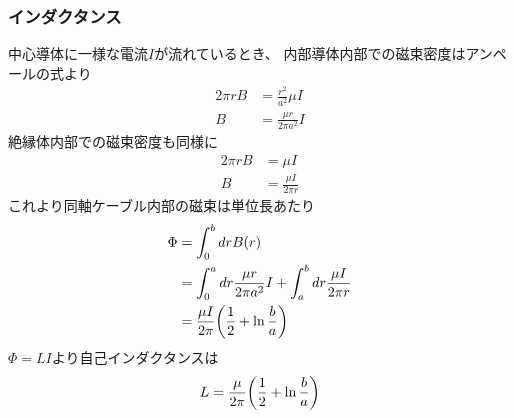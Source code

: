 \documentclass[../../master.tex]{subfiles}
\begin{document}
\subsubsection{インダクタンス}
中心導体に一様な電流\(I\)が流れているとき、
内部導体内部での磁束密度はアンペールの式より
\begin{align}
    2\pi r B &= \frac{r^2}{a^2}\mu I\\
    B &= \frac{\mu r}{2\pi a^2} I
\end{align}
絶縁体内部での磁束密度も同様に
\begin{align}
    2\pi r B &= \mu I\\
    B &= \frac{\mu I}{2\pi r}
\end{align}
これより同軸ケーブル内部の磁束は単位長あたり
\begin{align}
    \Phi
    &= \int_{0}^{b} dr B(r)\\
    &= \int_{0}^{a} dr \frac{\mu r}{2\pi a^2} I + \int_{a}^{b} dr \frac{\mu I}{2\pi r}\\
    &= \frac{\mu I}{2\pi}\qty(\frac{1}{2}+\ln\frac{b}{a})
\end{align}
\(\Phi=LI\)より自己インダクタンスは
\begin{align}
    L = \frac{\mu}{2\pi}\qty(\frac{1}{2}+\ln\frac{b}{a})
\end{align}
\end{document}
